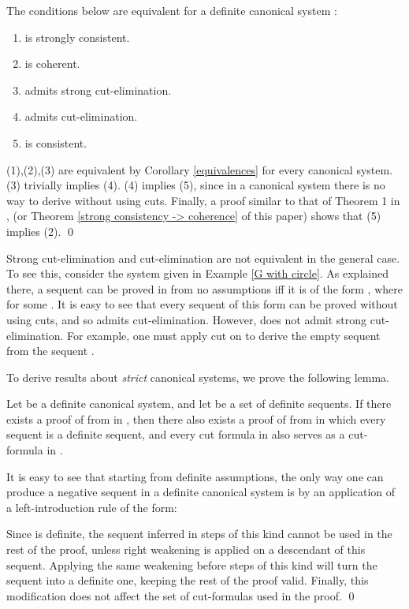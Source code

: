 \documentclass{LMCS}
\theoremstyle{remark}
\newcommand{\be}{\begin{enumerate}[(1)]}
\newcommand{\ee}{\end{enumerate}}
\begin{document}
\begin{enumerate}[(a)]
\begin{enumerate}[\bf(a):]
\begin{cor}
\label{equivalences definite}
The conditions below are equivalent for a 
definite canonical system :
\be
\item  is strongly consistent.
\item  is coherent.
\item  admits strong cut-elimination.
\item  admits cut-elimination.
\item  is consistent.
\ee
\end{cor}
\proof
(1),(2),(3) are equivalent by Corollary \ref{equivalences} for 
every canonical system.
(3) trivially implies (4). 
(4) implies (5), since in a canonical system
there is no way to derive  without using cuts.
Finally, a proof similar to that of Theorem 1 in \cite{AL10}, 
(or Theorem \ref{strong consistency -> coherence} of this paper) shows that 
(5) implies (2).
\qed

\begin{rem}
Strong cut-elimination and cut-elimination are not equivalent in the general case.
To see this, consider the system  given in Example \ref{G with circle}.
As explained there, a sequent  can be proved in  from no assumptions
iff it is of the form , where  for some .
It is easy to see that every sequent of this form can be proved without using cuts,
and so  admits cut-elimination.
However,  does not admit strong cut-elimination. For example, 
one must apply cut on  to derive the empty sequent from the sequent .
\end{rem}

To derive results about {\em strict} canonical systems, we prove the following lemma.

\begin{lem}
\label{strict lemma}
Let  be a definite canonical system,
and let  be a set of definite sequents.
If there exists a proof  of  from  in ,
then there also exists a proof  of  from  
in which every sequent is a definite sequent,
and every cut formula in  also serves as a cut-formula in .
\end{lem}
\proof
It is easy to see that starting from definite assumptions,
the only way one can produce a negative sequent in a definite canonical system 
is by an application of a left-introduction rule of the form:

Since  is definite, the sequent inferred in steps of this kind
cannot be used in the rest of the proof, unless right weakening is applied on a descendant of this sequent.
Applying the same weakening before steps of this kind will turn 
the sequent into a definite one, keeping the rest of the proof valid.
Finally, this modification does not affect the set of cut-formulas used in the proof.
\qed


\end{enumerate}
\end{enumerate}
\end{document}
